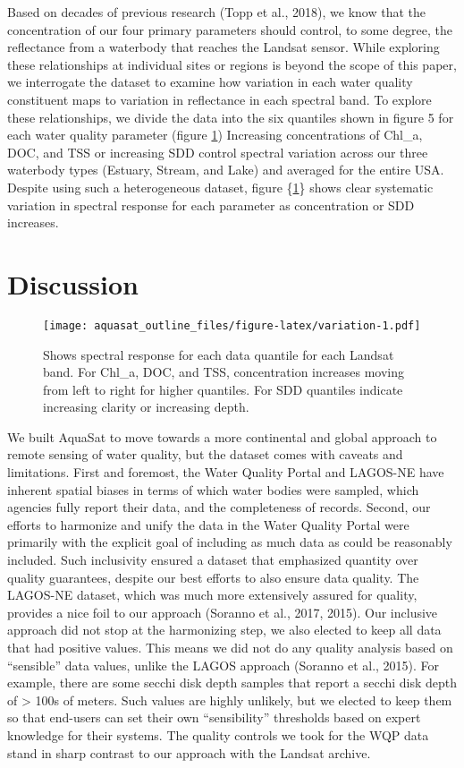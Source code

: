 \documentclass[]{article}
\begin{document}
Based on decades of previous research (Topp et al., 2018), we know that
the concentration of our four primary parameters should control, to some
degree, the reflectance from a waterbody that reaches the Landsat
sensor. While exploring these relationships at individual sites or
regions is beyond the scope of this paper, we interrogate the dataset to
examine how variation in each water quality constituent maps to
variation in reflectance in each spectral band. To explore these
relationships, we divide the data into the six quantiles shown in figure
5 for each water quality parameter (figure \ref{fig:captured})
Increasing concentrations of Chl\_a, DOC, and TSS or increasing SDD
control spectral variation across our three waterbody types (Estuary,
Stream, and Lake) and averaged for the entire USA. Despite using such a
heterogeneous dataset, figure \{\ref{fig:captured}\} shows clear
systematic variation in spectral response for each parameter as
concentration or SDD increases.

\hypertarget{discussion}{%
\section{Discussion}\label{discussion}}

\begin{figure}
\centering
\texttt{[image: aquasat\_outline\_files/figure-latex/variation-1.pdf]}
\caption{\label{fig:captured} Shows spectral response for each data
quantile for each Landsat band. For Chl\_a, DOC, and TSS, concentration
increases moving from left to right for higher quantiles. For SDD
quantiles indicate increasing clarity or increasing depth.}
\end{figure}

We built AquaSat to move towards a more continental and global approach
to remote sensing of water quality, but the dataset comes with caveats
and limitations. First and foremost, the Water Quality Portal and
LAGOS-NE have inherent spatial biases in terms of which water bodies
were sampled, which agencies fully report their data, and the
completeness of records. Second, our efforts to harmonize and unify the
data in the Water Quality Portal were primarily with the explicit goal
of including as much data as could be reasonably included. Such
inclusivity ensured a dataset that emphasized quantity over quality
guarantees, despite our best efforts to also ensure data quality. The
LAGOS-NE dataset, which was much more extensively assured for quality,
provides a nice foil to our approach (Soranno et al., 2017, 2015). Our
inclusive approach did not stop at the harmonizing step, we also elected
to keep all data that had positive values. This means we did not do any
quality analysis based on ``sensible'' data values, unlike the LAGOS
approach (Soranno et al., 2015). For example, there are some secchi disk
depth samples that report a secchi disk depth of \textgreater{} 100s of
meters. Such values are highly unlikely, but we elected to keep them so
that end-users can set their own ``sensibility'' thresholds based on
expert knowledge for their systems. The quality controls we took for the
WQP data stand in sharp contrast to our approach with the Landsat
archive.
\end{document}
